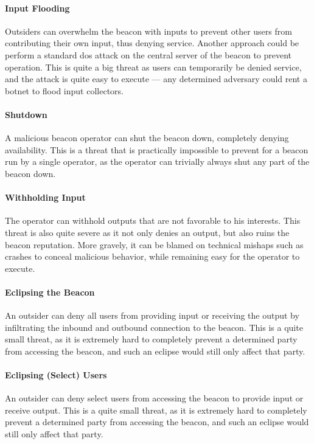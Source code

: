\newcommand{\parathreat}[1]{\paragraph{#1}\hspace{-1ex}}

\parathreat{Input Flooding} Outsiders can overwhelm the beacon with inputs to prevent other users from contributing their own input, thus denying service. Another approach could be perform a standard \gls{dos} attack on the central server of the beacon to prevent operation. This is quite a big threat as users can temporarily be denied service, and the attack is quite easy to execute --- any determined adversary could rent a botnet to flood input collectors.    %
\parathreat{Shutdown} A malicious beacon operator can shut the beacon down, completely denying availability. This is a threat that is practically impossible to prevent for a beacon run by a single operator, as the operator can trivially always shut any part of the beacon down.
\parathreat{Withholding Input} The operator can withhold outputs that are not favorable to his interests. This threat is also quite severe as it not only denies an output, but also ruins the beacon reputation. More gravely, it can be blamed on technical mishaps such as crashes to conceal malicious behavior, while remaining easy for the operator to execute.
\parathreat{Eclipsing the Beacon} An outsider can deny all users from providing input or receiving the output by infiltrating the inbound and outbound connection to the beacon. This is a quite small threat, as it is extremely hard to completely prevent a determined party from accessing the beacon, and such an eclipse would still only affect that party.
\parathreat{Eclipsing (Select) Users} An outsider can deny select users from accessing the beacon to provide input or receive output. This is a quite small threat, as it is extremely hard to completely prevent a determined party from accessing the beacon, and such an eclipse would still only affect that party.
